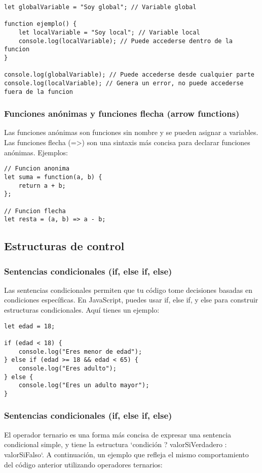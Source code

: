 \documentclass[executivepaper]{article}
\begin{document}
\begin{lstlisting}
let globalVariable = "Soy global"; // Variable global

function ejemplo() {
    let localVariable = "Soy local"; // Variable local
    console.log(localVariable); // Puede accederse dentro de la funcion
}

console.log(globalVariable); // Puede accederse desde cualquier parte
console.log(localVariable); // Genera un error, no puede accederse fuera de la funcion
\end{lstlisting}

\subsubsection*{Funciones anónimas y funciones flecha (arrow functions)}
Las funciones anónimas son funciones sin nombre y se pueden asignar a variables. Las funciones flecha (=>) son una sintaxis más concisa para declarar funciones anónimas. Ejemplos:

\begin{lstlisting}
// Funcion anonima
let suma = function(a, b) {
    return a + b;
};

// Funcion flecha
let resta = (a, b) => a - b;
\end{lstlisting}

\subsection{Estructuras de control}
\subsubsection*{Sentencias condicionales (if, else if, else)}
Las sentencias condicionales permiten que tu código tome decisiones basadas en condiciones específicas. En JavaScript, puedes usar if, else if, y else para construir estructuras condicionales. Aquí tienes un ejemplo:

\begin{lstlisting}
let edad = 18;

if (edad < 18) {
    console.log("Eres menor de edad");
} else if (edad >= 18 && edad < 65) {
    console.log("Eres adulto");
} else {
    console.log("Eres un adulto mayor");
}  
\end{lstlisting}

\subsubsection*{Sentencias condicionales (if, else if, else)}
El operador ternario es una forma más concisa de expresar una sentencia condicional simple, y tiene la estructura `condición ? valorSiVerdadero : valorSiFalso`. A continuación, un ejemplo que refleja el mismo comportamiento del código anterior utilizando operadores ternarios:
\end{document}
